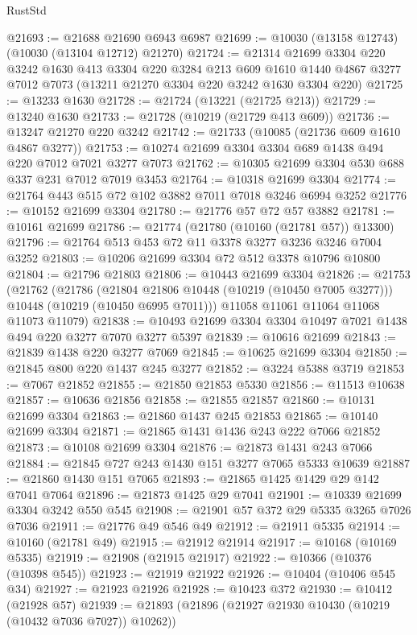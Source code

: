 \begin{lexlean}{RustStd}
\begin{coremodule}
@21693 := @21688 @21690 @6943 @6987
@21699 := @10030 (@13158 @12743) (@10030 (@13104 @12712) @21270)
@21724 := @21314
    @21699
    @3304
    @220
    @3242
    @1630
    @413
    @3304
    @220
    @3284
    @213
    @609
    @1610
    @1440
    @4867
    @3277
    @7012
    @7073
    (@13211 @21270 @3304 @220 @3242 @1630 @3304 @220)
@21725 := @13233 @1630
@21728 := @21724 (@13221 (@21725 @213))
@21729 := @13240 @1630
@21733 := @21728 (@10219 (@21729 @413 @609))
@21736 := @13247 @21270 @220 @3242
@21742 := @21733 (@10085 (@21736 @609 @1610 @4867 @3277))
@21753 := @10274 @21699 @3304 @3304 @689 @1438 @494 @220 @7012 @7021 @3277 @7073
@21762 := @10305 @21699 @3304 @530 @688 @337 @231 @7012 @7019 @3453
@21764 := @10318 @21699 @3304
@21774 := @21764 @443 @515 @72 @102 @3882 @7011 @7018 @3246 @6994 @3252
@21776 := @10152 @21699 @3304
@21780 := @21776 @57 @72 @57 @3882
@21781 := @10161 @21699
@21786 := @21774 (@21780 (@10160 (@21781 @57)) @13300)
@21796 := @21764 @513 @453 @72 @11 @3378 @3277 @3236 @3246 @7004 @3252
@21803 := @10206 @21699 @3304 @72 @512 @3378 @10796 @10800
@21804 := @21796 @21803
@21806 := @10443 @21699 @3304
@21826 := @21753
    (@21762
      (@21786
        (@21804 @21806 @10448 (@10219 (@10450 @7005 @3277)))
        @10448
        (@10219 (@10450 @6995 @7011)))
      @11058
      @11061
      @11064
      @11068
      @11073
      @11079)
@21838 := @10493 @21699 @3304 @3304 @10497 @7021 @1438 @494 @220 @3277 @7070 @3277 @5397
@21839 := @10616 @21699
@21843 := @21839 @1438 @220 @3277 @7069
@21845 := @10625 @21699 @3304
@21850 := @21845 @800 @220 @1437 @245 @3277
@21852 := @3224 @5388 @3719
@21853 := @7067 @21852
@21855 := @21850 @21853 @5330
@21856 := @11513 @10638
@21857 := @10636 @21856
@21858 := @21855 @21857
@21860 := @10131 @21699 @3304
@21863 := @21860 @1437 @245 @21853
@21865 := @10140 @21699 @3304
@21871 := @21865 @1431 @1436 @243 @222 @7066 @21852
@21873 := @10108 @21699 @3304
@21876 := @21873 @1431 @243 @7066
@21884 := @21845 @727 @243 @1430 @151 @3277 @7065 @5333 @10639
@21887 := @21860 @1430 @151 @7065
@21893 := @21865 @1425 @1429 @29 @142 @7041 @7064
@21896 := @21873 @1425 @29 @7041
@21901 := @10339 @21699 @3304 @3242 @550 @545
@21908 := @21901 @57 @372 @29 @5335 @3265 @7026 @7036
@21911 := @21776 @49 @546 @49
@21912 := @21911 @5335
@21914 := @10160 (@21781 @49)
@21915 := @21912 @21914
@21917 := @10168 (@10169 @5335)
@21919 := @21908 (@21915 @21917)
@21922 := @10366 (@10376 (@10398 @545))
@21923 := @21919 @21922
@21926 := @10404 (@10406 @545 @34)
@21927 := @21923 @21926
@21928 := @10423 @372
@21930 := @10412 (@21928 @57)
@21939 := @21893 (@21896 (@21927 @21930 @10430 (@10219 (@10432 @7036 @7027)) @10262))

\end{coremodule}
\end{lexlean}

